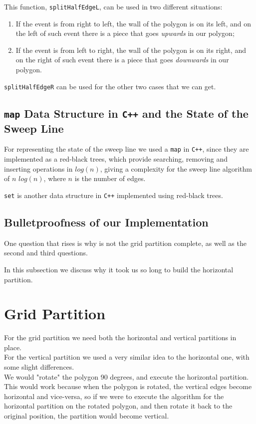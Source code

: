 \documentclass[12pt,a4paper,oneside]{article}
\begin{document}
This function, \texttt{splitHalfEdgeL}, can be used in two different situations:

\begin{enumerate}
	\item If the event is from right to left, the wall of the polygon is on its left, and on the left of such event there is a piece that goes \textit{upwards} in our polygon;
	\item If the event is from left to right, the wall of the polygon is on its right, and on the right of such event there is a piece that goes \textit{downwards} in our polygon.
\end{enumerate}

\texttt{splitHalfEdgeR} can be used for the other two cases that we can get.

\subsection{\texttt{map} Data Structure in \texttt{C++} and the State of the Sweep Line}

For representing the state of the sweep line we used a \texttt{map} in \texttt{C++}, since they are implemented as a red-black trees, which provide searching, removing and inserting operations in $log(n)$, giving a complexity for the sweep line algorithm of $n$ $log(n)$, where $n$ is the number of edges.

\texttt{set} is another data structure in \texttt{C++} implemented using red-black trees.

\subsection{Bulletproofness of our Implementation}\label{subsec:bullet}

One question that rises is why is not the grid partition complete, as well as the second and third questions.

In this subsection we discuss why it took us so long to build the horizontal partition.

\section{Grid Partition}\label{sec:grid}
For the grid partition we need both the horizontal and vertical partitions in place.\\
For the vertical partition we used a very similar idea to the horizontal one, with some slight differences.\\
We would "rotate" the polygon 90 degrees, and execute the horizontal partition. This would work because when the polygon is rotated, the vertical edges become horizontal and vice-versa, so if we were to execute the algorithm for the horizontal partition on the rotated polygon, and then rotate it back to the original position, the partition would become vertical.
\end{document}
